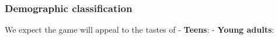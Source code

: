 \subsubsection{Demographic classification}
We expect the game will appeal to the tastes of 
- \textbf{Teens}:
- \textbf{Young adults}:

\pagebreak